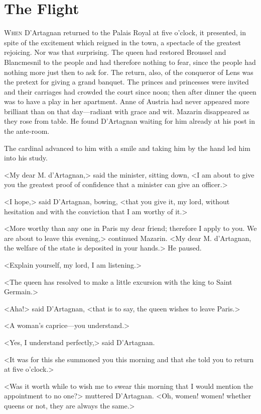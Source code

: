 \chapter{The Flight}

 \lettrine{W}{hen} D'Artagnan returned to the Palais Royal at five o'clock, it presented, in spite of the excitement which reigned in the town, a spectacle of the greatest rejoicing. Nor was that surprising. The queen had restored Broussel and Blancmesnil to the people and had therefore nothing to fear, since the people had nothing more just then to ask for. The return, also, of the conqueror of Lens was the pretext for giving a grand banquet. The princes and princesses were invited and their carriages had crowded the court since noon; then after dinner the queen was to have a play in her apartment. Anne of Austria had never appeared more brilliant than on that day—radiant with grace and wit. Mazarin disappeared as they rose from table. He found D'Artagnan waiting for him already at his post in the ante-room.

The cardinal advanced to him with a smile and taking him by the hand led him into his study.

<My dear M. d'Artagnan,> said the minister, sitting down, <I am about to give you the greatest proof of confidence that a minister can give an officer.>

<I hope,> said D'Artagnan, bowing, <that you give it, my lord, without hesitation and with the conviction that I am worthy of it.>

<More worthy than any one in Paris my dear friend; therefore I apply to you. We are about to leave this evening,> continued Mazarin. <My dear M. d'Artagnan, the welfare of the state is deposited in your hands.> He paused.

<Explain yourself, my lord, I am listening.>

<The queen has resolved to make a little excursion with the king to Saint Germain.>

<Aha!> said D'Artagnan, <that is to say, the queen wishes to leave Paris.>

<A woman's caprice—you understand.>

<Yes, I understand perfectly,> said D'Artagnan.

<It was for this she summoned you this morning and that she told you to return at five o'clock.>

<Was it worth while to wish me to swear this morning that I would mention the appointment to no one?> muttered D'Artagnan. <Oh, women! women! whether queens or not, they are always the same.>

